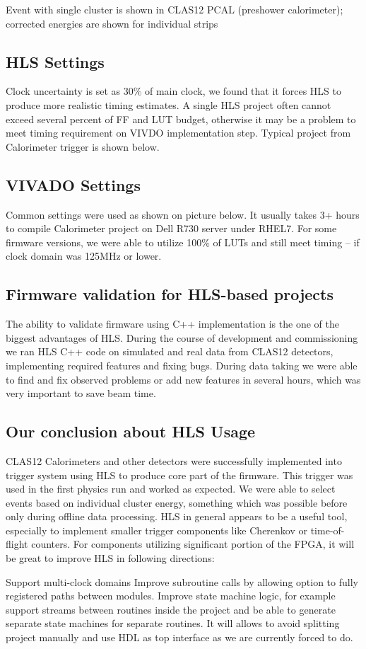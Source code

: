 Event with single cluster is shown in
CLAS12 PCAL (preshower calorimeter); corrected energies are shown for individual strips

\subsection{HLS Settings}

Clock uncertainty is set as 30\% of main clock, we found that it forces HLS to produce more realistic timing estimates. A single HLS project often cannot exceed several percent of FF and LUT budget, otherwise it may be a problem to meet timing requirement on VIVDO implementation step. Typical project from Calorimeter trigger is shown below.

\subsection{VIVADO Settings}

Common settings were used as shown on picture below. It usually takes 3+ hours to compile Calorimeter project on Dell R730 server under RHEL7. For some firmware versions, we were able to utilize 100\% of LUTs and still meet timing – if clock domain was 125MHz or lower.

\subsection{Firmware validation for HLS-based projects}

The ability to validate firmware using C++ implementation is the one of the biggest advantages of HLS. During the course of development and commissioning we ran HLS C++ code on simulated and real data from CLAS12 detectors, implementing required features and fixing bugs. During data taking we were able to find and fix observed problems or add new features in several hours, which was very important to save beam time.

\subsection{Our conclusion about HLS Usage}

CLAS12 Calorimeters and other detectors were successfully implemented into trigger system using HLS to produce core part of the firmware. This trigger was used in the first physics run and worked as expected. We were able to select events based on individual cluster energy, something which was possible before only during offline data processing.
HLS in general appears to be a useful tool, especially to implement smaller trigger components like Cherenkov or time-of-flight counters. For components utilizing significant portion of the FPGA, it will be great to improve HLS in following directions:

Support multi-clock domains
Improve subroutine calls by allowing option to fully registered paths between modules. 
Improve state machine logic, for example support streams between routines inside the project and be able to generate separate state machines for separate routines. It will allows to avoid splitting project manually and use HDL as top interface as we are currently forced to do.

